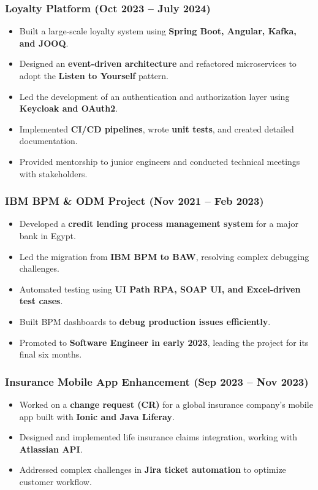 \documentclass[a4paper,11pt]{article}
\begin{document}
{\subsubsection*{Loyalty Platform (Oct 2023 – July 2024)}
\begin{itemize}
    \item Built a large-scale loyalty system using \textbf{Spring Boot, Angular, Kafka, and JOOQ}.
    \item Designed an \textbf{event-driven architecture} and refactored microservices to adopt the \textbf{Listen to Yourself} pattern.
    \item Led the development of an authentication and authorization layer using \textbf{Keycloak and OAuth2}.
    \item Implemented \textbf{CI/CD pipelines}, wrote \textbf{unit tests}, and created detailed documentation.
    \item Provided mentorship to junior engineers and conducted technical meetings with stakeholders.
\end{itemize}


\subsubsection*{IBM BPM \& ODM Project (Nov 2021 – Feb 2023)}
\begin{itemize}
    \item Developed a \textbf{credit lending process management system} for a major bank in Egypt.
    \item Led the migration from \textbf{IBM BPM to BAW}, resolving complex debugging challenges.
    \item Automated testing using \textbf{UI Path RPA, SOAP UI, and Excel-driven test cases}.
    \item Built BPM dashboards to \textbf{debug production issues efficiently}.
    \item Promoted to \textbf{Software Engineer in early 2023}, leading the project for its final six months.
\end{itemize}

\subsubsection*{Insurance Mobile App Enhancement (Sep 2023 – Nov 2023)}
\begin{itemize}
    \item Worked on a \textbf{change request (CR)} for a global insurance company's mobile app built with \textbf{Ionic and Java Liferay}.
    \item Designed and implemented life insurance claims integration, working with \textbf{Atlassian API}.
    \item Addressed complex challenges in \textbf{Jira ticket automation} to optimize customer workflow.
\end{itemize}

}
\end{document}
